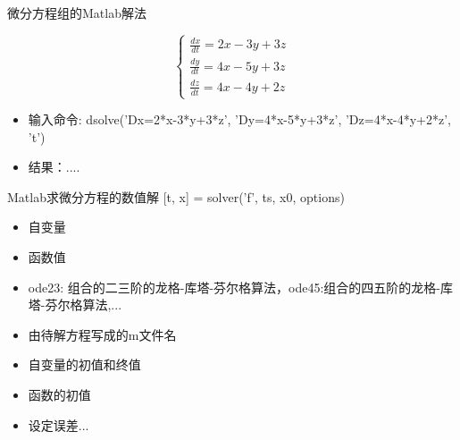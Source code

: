 \documentclass[mathserif, table]{beamer}
\begin{document}
\begin{frame}{微分方程组的Matlab解法}
  \begin{block}{}
  \[
  \left\{
  \begin{array}{l}
    \frac{dx}{dt}=2x-3y+3z\\
    \frac{dy}{dt}=4x-5y+3z\\
    \frac{dz}{dt}=4x-4y+2z
  \end{array}
  \right.
  \]
  \end{block}

  \begin{itemize}
  \item 输入命令: dsolve('Dx=2*x-3*y+3*z', 'Dy=4*x-5*y+3*z', 'Dz=4*x-4*y+2*z', 't')
  \item 结果：....
  \end{itemize}
  
\end{frame}

\begin{frame}{Matlab求微分方程的数值解}
  [t, x] = solver('f', ts, x0, options)

  \begin{itemize}
  \item [t] 自变量
  \item [x] 函数值
  \item [solver] ode23: 组合的二三阶的龙格-库塔-芬尔格算法，ode45:组合的四五阶的龙格-库塔-芬尔格算法,...
  \item [f] 由待解方程写成的m文件名
  \item [ts] 自变量的初值和终值
  \item [x0] 函数的初值
  \item [options] 设定误差...
  \end{itemize}

\end{frame}
\end{document}
